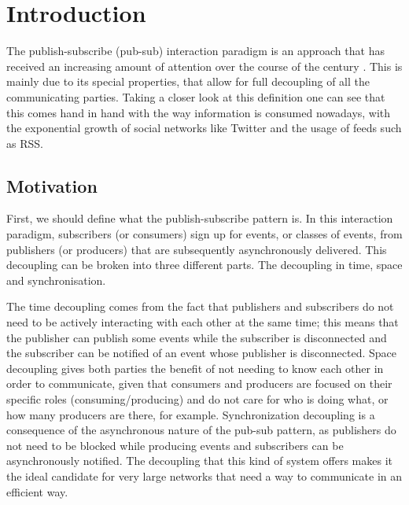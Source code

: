 
\chapter{Introduction}
\label{chapter:introduction}

The publish-subscribe (pub-sub) interaction paradigm is an approach that has
received an increasing amount of attention over the course of the century
\cite{Kermarrec2013} \cite{Eugster2003}.  This is mainly due to its special
properties, that allow for full decoupling of all the communicating parties.
Taking a closer look at this definition one can see that this comes hand in
hand with the way information is consumed nowadays, with the exponential growth
of social networks like Twitter and the usage of feeds such as RSS.

\section{Motivation}
First, we should define what the publish-subscribe pattern is.  In this
interaction paradigm, subscribers (or consumers) sign up for events, or classes
of events, from publishers (or producers) that are subsequently asynchronously
delivered. This decoupling can be broken into three different parts. The
decoupling in time, space and synchronisation.

The time decoupling comes from the fact that publishers and subscribers do not
need to be actively interacting with each other at the same time; this means
that the publisher can publish some events while the subscriber is disconnected
and the subscriber can be notified of an event whose publisher is disconnected.
Space decoupling gives both parties the benefit of not needing to know each
other in order to communicate, given that consumers and producers are focused
on their specific roles (consuming/producing) and do not care for who is doing
what, or how many producers are there, for example. Synchronization decoupling is a
consequence of the asynchronous nature of the pub-sub pattern, as publishers do
not need to be blocked while producing events and subscribers can be
asynchronously notified.  The decoupling that this kind of system offers makes
it the ideal candidate for very large networks that need a way to communicate
in an efficient way.

